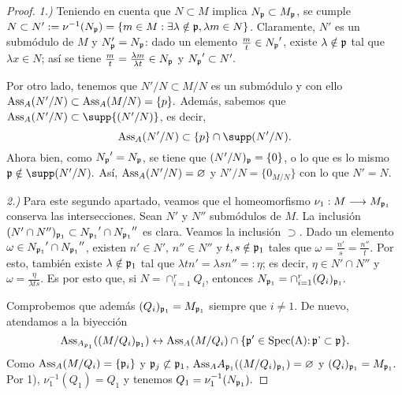 \documentclass[../main.tex]{subfiles}
\begin{document}
\begin{proof}
	\textit{1.)} Teniendo en cuenta que $N\subset M$ implica $N_{\mathfrak{p}}\subset M_{\mathfrak{p}}$, se cumple $N\subset N':=\nu^{-1}(N_{\mathfrak{p}})=\{m\in M:\exists\lambda\notin\mathfrak{p}, \lambda m\in N\}$. Claramente, $N'$ es un submódulo de $M$ y $N_{\mathfrak{p}}'=N_{\mathfrak{p}}$: dado un elemento $\frac{m}{t}\in {N_{\mathfrak{p}}}'$, existe $\lambda\notin\mathfrak{p}$ tal que $\lambda x\in N$; así se tiene $\frac{m}{t}=\frac{\lambda m}{\lambda t}\in N_{\mathfrak{p}}$ y ${N_{\mathfrak{p}}}'\subset N'.$
	
	Por otro lado, tenemos que $N'/N\subset M/N$ es un submódulo y con ello $\text{Ass}_A(N'/N)\subset\text{Ass}_A(M/N)=\{p\}.$ Además, sabemos que $\Ass_A(N'/N)\subset\supp\{(N'/N)\}$, es decir,
	$$\Ass_A(N'/N)\subset\{p\}\cap\supp(N'/N).$$
	Ahora bien, como ${N_{\mathfrak{p}}}'=N_{\mathfrak{p}}$, se tiene que $(N'/N)_{\mathfrak{p}}=\{0\}$, o lo que es lo mismo $\p\notin\supp(N'/N).$ Así, $\text{Ass}_A(N'/N)=\varnothing$ y $N'/N=\{0_{M/N}\}$ con lo que $N'=N.$
	
	\textit{2.)} Para este segundo apartado, veamos que el homeomorfismo $\nu_1:M\longrightarrow M_{\mathfrak{p}_1}$ conserva las intersecciones. Sean $N'$ y $N''$ submódulos de $M$. La inclusión $(N'\cap N'')_{\mathfrak{p}_1}\subset {N_{\mathfrak{p}_1}}'\cap{N_{\mathfrak{p}_1}}''$ es clara. Veamos la inclusión $\supset.$ Dado un elemento $\omega\in {N_{\mathfrak{p}_1}}'\cap{N_{\mathfrak{p}_1}}''$, existen $n'\in N'$, $n''\in N''$ y $t,s\notin\mathfrak{p}_1$ tales que $\omega=\frac{n'}{s}=\frac{n''}{t}.$ Por esto, también existe $\lambda\notin\mathfrak{p}_1$ tal que $\lambda tn'=\lambda sn''=:\eta$; es decir, $\eta\in N'\cap N''$ y $\omega=\frac{\eta}{\lambda ts}.$ Es por esto que, si $N=\cap_{i=1}^r Q_i$, entonces $N_{\mathfrak{p}_1}=\cap_{i=1}^r(Q_i)_{\mathfrak{p}_1}.$ 
	
	Comprobemos que además $(Q_i)_{\mathfrak{p}_1}=M_{\mathfrak{p}_1}$ siempre que $i\neq 1.$ De nuevo, atendamos a la biyección
	$$\text{Ass}_{A_{\mathfrak{p}_1}}((M/Q_i)_{\mathfrak{p}_1})\leftrightarrow\text{Ass}_A(M/Q_i)\cap\{\mathfrak{p}'\in\operatorname{Spec(A):\mathfrak{p}'\subset\mathfrak{p}}\}.$$
	Como $\text{Ass}_A(M/Q_i)=\{\mathfrak{p}_i\}$ y $\mathfrak{p}_j\not\subset\mathfrak{p}_1$, $\text{Ass}_A{A_{\mathfrak{p}_1}}((M/Q_i)_{\mathfrak{p}_1})=\varnothing$ y $(Q_i)_{\mathfrak{p}_1}=M_{\mathfrak{p}_1}.$ Por 1), $\nu_1^{-1}(Q_1)=Q_1$ y tenemos $Q_1=\nu_1^{-1}(N_{\mathfrak{p}_1}).$
\end{proof}
\end{document}
